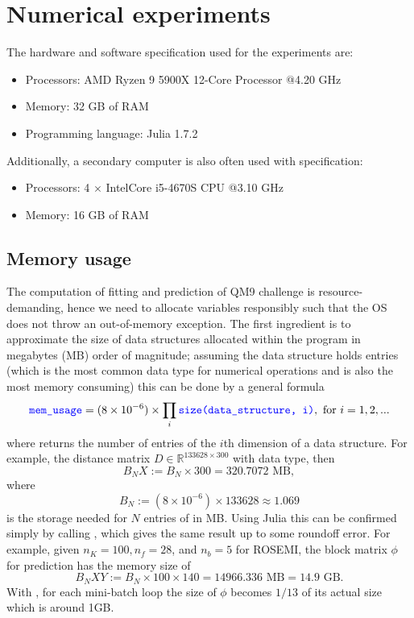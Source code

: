 \documentclass[12pt]{article}
\begin{document}
\section{Numerical experiments}
The hardware and software specification used for the experiments are:
\begin{itemize}
	\item Processors: AMD Ryzen 9 5900X 12-Core Processor @4.20 GHz
	\item Memory: 32 GB of RAM
	\item Programming language: Julia 1.7.2
\end{itemize}
Additionally, a secondary computer is also often used with specification:
\begin{itemize}
	\item Processors: 4 $\times$ Intel\textregistered Core i5-4670S CPU @3.10 GHz
	\item Memory: 16 GB of RAM
\end{itemize}

\subsection{Memory usage}
The computation of fitting and prediction of QM9 challenge is resource-demanding, hence we need to allocate variables responsibly such that the OS does not throw an out-of-memory exception. The first ingredient is to approximate the size of data structures allocated within the program in megabytes (MB) order of magnitude; assuming the data structure holds  entries (which is the most common data type for numerical operations and is also the most memory consuming) this can be done by a general formula
\begin{equation}
	\codeword{mem_usage} = (8\times 10^{-6}) \times \prod_{i}\codeword{size(data_structure, i)}, \text{ for } i = 1,2,...
\end{equation}
where  returns the number of entries of the $i$th dimension of a data structure. For example, the distance matrix $D \in \mathbb{R}^{133628 \times 300}$ with  data type, then
\begin{equation}
	B_NX := B_N \times 300 = 320.7072 \text{ MB},
\end{equation}
where
\begin{equation}
	B_N := (8\times 10^{-6}) \times 133628 \approx 1.069
\end{equation}
is the storage needed for $N$ entries of  in MB.
Using Julia this can be confirmed simply by calling , which gives the same result up to some roundoff error. For example, given $n_K = 100,n_f=28$, and $n_b = 5$ for ROSEMI, the block matrix $\phi$ for prediction has the memory size of
\begin{equation}
	B_NXY := B_N \times 100 \times 140 = 14966.336 \text{ MB} = 14.9 \text{ GB}.
\end{equation}
With , for each mini-batch loop the size of $\phi$ becomes $1/13$ of its actual size which is around 1GB. 
\end{document}
